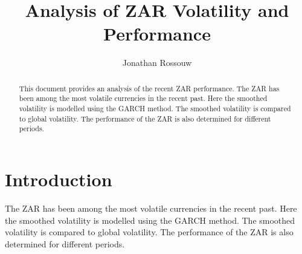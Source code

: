 \documentclass[11pt,preprint, authoryear]{elsarticle}
\numberwithin{equation}{section}
\numberwithin{figure}{section}
\numberwithin{table}{section}
\begin{document}
\begin{frontmatter}  %

\title{Analysis of ZAR Volatility and Performance}





\author[Add1]{Jonathan Rossouw}







\begin{abstract}
\small{
This document provides an analysis of the recent ZAR performance. The
ZAR has been among the most volatile currencies in the recent past. Here
the smoothed volatility is modelled using the GARCH method. The smoothed
volatility is compared to global volatility. The performance of the ZAR
is also determined for different periods.
}
\end{abstract}

\vspace{1cm}





\vspace{0.5cm}

\end{frontmatter}



\pagestyle{fancy}
\chead{}
\rhead{}
\lfoot{}
\rfoot{}
\lhead{}
\cfoot{}


\headsep 35pt %




\hypertarget{introduction}{%
\section{\texorpdfstring{Introduction
\label{Introduction}}{Introduction }}\label{introduction}}

The ZAR has been among the most volatile currencies in the recent past.
Here the smoothed volatility is modelled using the GARCH method. The
smoothed volatility is compared to global volatility. The performance of
the ZAR is also determined for different periods.
\end{document}
